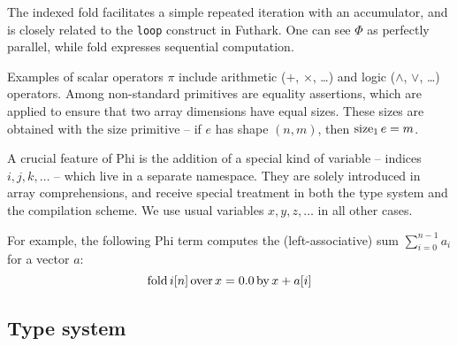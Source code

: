 The indexed fold facilitates a simple repeated iteration with an accumulator, and is closely related to the \texttt{loop} construct in Futhark. One can see $\Phi$ as perfectly parallel, while $\mathrm{fold}$ expresses sequential computation.

Examples of scalar operators $\pi$ include arithmetic ($+$, $\times$, \dots) and logic ($\land$, $\lor$, \dots) operators. Among non-standard primitives are equality assertions, which are applied to ensure that two array dimensions have equal sizes. These sizes are obtained with the $\mathrm{size}$ primitive -- if $e$ has shape $(n, m)$, then $\mathrm{size}_{1}\, {e} = m$.

A crucial feature of Phi is the addition of a special kind of variable -- indices $i, j, k, \dots$ -- which live in a separate namespace. They are solely introduced in array comprehensions, and receive special treatment in both the type system and the compilation scheme. We use usual variables $x, y, z, \dots$ in all other cases.

For example, the following Phi term computes the (left-associative) sum $\sum_{i=0}^{n-1} a_i$ for a vector $a$:
$$ \mathrm{fold}\,{i}[{n}]\,\mathrm{over}\,{x} = {0.0}\,\mathrm{by}\,{x + a[i]} $$

\subsection{Type system}

\newcommand{\phifloattype}{\mathrm{Float}}
\newcommand{\phiinttype}{\mathrm{Int}}
\newcommand{\phinattype}{\phiinttype}
\newcommand{\phibooltype}{\mathrm{Bool}}
\newcommand{\phivectype}[1]{\Box{#1}}
\newcommand{\phipairtype}[2]{{#1} \times {#2}}


